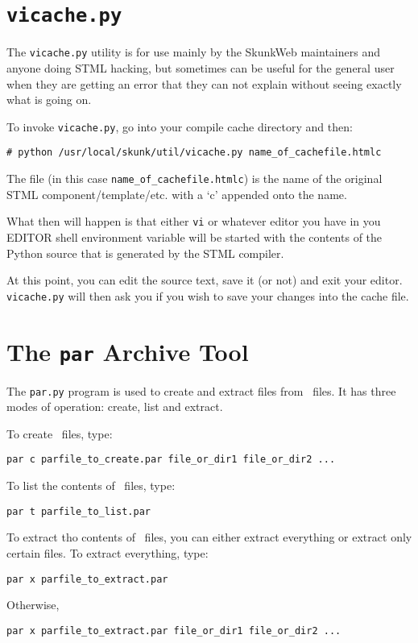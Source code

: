 \documentclass[titlepage]{manual}
\begin{document}
\section{\texttt{vicache.py}}
The \texttt{vicache.py} utility is for use mainly by the SkunkWeb maintainers
and anyone doing STML hacking, but sometimes can be useful for the general
user when they are getting an error that they can not explain without
seeing exactly what is going on.

To invoke \texttt{vicache.py}, go into your compile cache directory
and then:
\begin{verbatim}
# python /usr/local/skunk/util/vicache.py name_of_cachefile.htmlc
\end{verbatim}
The file (in this case \texttt{name\_of\_cachefile.htmlc}) is the name
of the original STML component/template/etc. with a `c' appended onto
the name.  

What then will happen is that either \texttt{vi} or whatever editor you
have in you EDITOR shell environment variable will be started with the
contents of the Python source that is generated by the STML compiler.

At this point, you can edit the source text, save it (or not) and exit your
editor.  \texttt{vicache.py} will then ask you if you wish to save your
changes into the cache file.


\section{The \texttt{par} Archive Tool}
\label{pardotpy}
The \texttt{par.py} program is used to create and extract files from
\PAR\ files.  It has three modes of operation: create, list and
extract.

To create \PAR\ files, type:
\begin{verbatim}
par c parfile_to_create.par file_or_dir1 file_or_dir2 ...
\end{verbatim}

To list the contents of \PAR\ files, type:
\begin{verbatim}
par t parfile_to_list.par
\end{verbatim}

To extract tho contents of \PAR\ files, you can either extract
everything or extract only certain files.  To extract everything,
type:
\begin{verbatim}
par x parfile_to_extract.par
\end{verbatim}

Otherwise,
\begin{verbatim}
par x parfile_to_extract.par file_or_dir1 file_or_dir2 ...
\end{verbatim}
\end{document}
